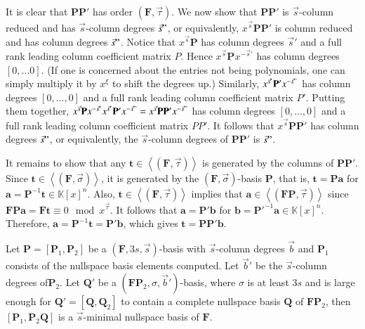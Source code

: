 \begin{pf}
It is clear that $\mathbf{P}\mathbf{P}'$ has order $(\mathbf{F},\vec{\tau})$.
We now show that $\mathbf{P}\mathbf{P}'$ is $\vec{s}$-column reduced
and has $\vec{s}$-column degrees $\vec{s}"$, or equivalently, $x^{\vec{s}}\mathbf{P}\mathbf{P}'$
is column reduced and has column degrees $\vec{s}"$. Notice that
$x^{\vec{s}}\mathbf{P}$ has column degrees $\vec{s}'$ and a full
rank leading column coefficient matrix $P$. Hence $x^{\vec{s}}\mathbf{P}x^{-\vec{s}'}$
has column degrees $\left[0,\dots0\right]$. (If one is concerned
about the entries not being polynomials, one can simply multiply it
by $x^{\xi}$ to shift the degrees up.) Similarly, $x^{\vec{s}'}\mathbf{P}'x^{-\vec{s}"}$
has column degrees $[0,\dots,0]$ and a full rank leading column coefficient
matrix $P'$. Putting them together, $x^{\vec{s}}\mathbf{P}x^{-\vec{s}'}x^{\vec{s}'}\mathbf{P}'x^{-\vec{s}"}=x^{\vec{s}}\mathbf{P}\mathbf{P}'x^{-\vec{s}"}$
has column degrees $[0,\dots,0]$ and a full rank leading column coefficient
matrix $PP'$. It follows that $x^{\vec{s}}\mathbf{P}\mathbf{P}'$
has column degrees $\vec{s}"$, or equivalently, the $\vec{s}$-column
degrees of $\mathbf{PP}'$ is $\vec{s}"$.

It remains to show that any $\mathbf{t}\in\left\langle \left(\mathbf{F},\vec{\tau}\right)\right\rangle $
is generated by the columns of $\mathbf{PP}'$. Since $\mathbf{t}\in\left\langle \left(\mathbf{F},\vec{\sigma}\right)\right\rangle $,
it is generated by the $\left(\mathbf{F},\vec{\sigma}\right)$-basis
$\mathbf{P}$, that is, $\mathbf{t}=\mathbf{P}\mathbf{a}$ for $\mathbf{a}=\mathbf{P}^{-1}\mathbf{t}\in\mathbb{K}\left[x\right]^{n}$.
Also, $\mathbf{t}\in\left\langle \left(\mathbf{F},\vec{\tau}\right)\right\rangle $
implies that $\mathbf{a}\in\left\langle \left(\mathbf{FP},\vec{\tau}\right)\right\rangle $
since $\mathbf{F}\mathbf{P}\mathbf{a}=\mathbf{F}\mathbf{t}\equiv0\mod x^{\vec{\tau}}$.
It follows that $\mathbf{a}=\mathbf{P}'\mathbf{b}$ for $\mathbf{b}=\mathbf{P}'^{-1}\mathbf{a}\in\mathbb{K}\left[x\right]^{n}$.
Therefore, $\mathbf{a}=\mathbf{P}^{-1}\mathbf{t}=\mathbf{P}'\mathbf{b}$,
which gives $\mathbf{t}=\mathbf{P}\mathbf{P}'\mathbf{b}$.\end{pf}
\begin{lem}
\label{lem:continueComputingNullspaceBasisByColumns}Let $\mathbf{P}=\left[\mathbf{P}_{1},\mathbf{P}_{2}\right]$
be a $\left(\mathbf{F},3s,\vec{s}\right)$-basis with $\vec{s}$-column
degrees $\vec{b}$ and $\mathbf{P}_{1}$ consists of the nullspace
basis elements computed. Let $\vec{b}'$ be the $\vec{s}$-column
degrees of$\mathbf{P}_{2}$. Let $\mathbf{Q}'$ be a $\left(\mathbf{F}\mathbf{P}_{2},\sigma,\vec{b}'\right)$-basis,
where $\sigma$ is at least $3s$ and is large enough for $\mathbf{Q}'=\left[\mathbf{Q},\mathbf{Q}_{2}\right]$
to contain a complete nullspace basis $\mathbf{Q}$ of $\mathbf{F}\mathbf{P}_{2}$,
then $\left[\mathbf{P}_{1},\mathbf{P}_{2}\mathbf{Q}\right]$ is a
$\vec{s}$-minimal nullspace basis of $\mathbf{F}$.\end{lem}

